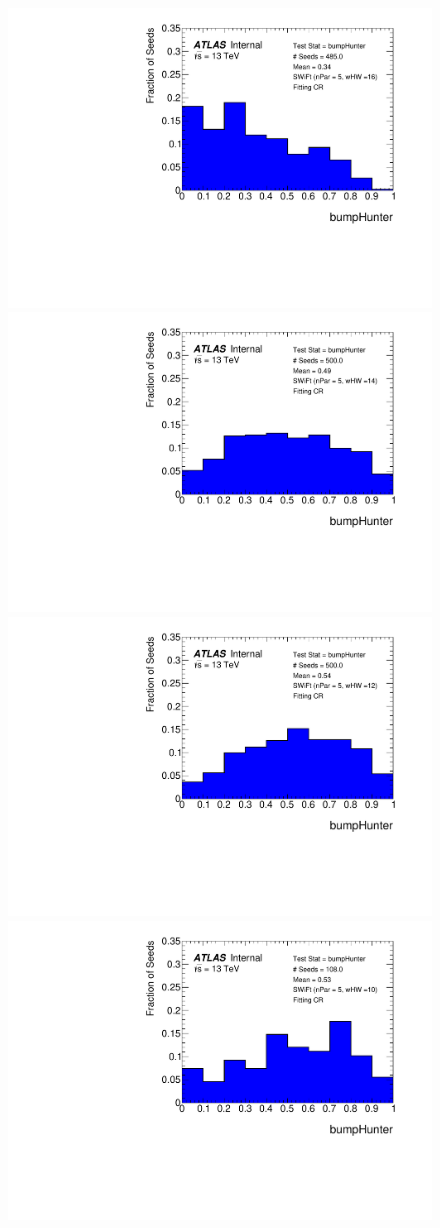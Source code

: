 \begin{figure}[!htb]
{}                                                                                              
 {                                                    
  \includegraphics[width=0.45\linewidth, angle=0]{figs/Dibjet/LowMass/FitStudy/pVal_bumpHunter_corrFitCR_5para_low16_high16.pdf}
}                                                                                              
 {                                                    
  \includegraphics[width=0.45\linewidth, angle=0]{figs/Dibjet/LowMass/FitStudy/pVal_bumpHunter_corrFitCR_5para_low14_high14.pdf}
}                                                                                              
 {                                                    
  \includegraphics[width=0.45\linewidth, angle=0]{figs/Dibjet/LowMass/FitStudy/pVal_bumpHunter_corrFitCR_5para_low12_high12.pdf}
}                                                                                              
 {                                                    
  \includegraphics[width=0.45\linewidth, angle=0]{figs/Dibjet/LowMass/FitStudy/pVal_bumpHunter_corrFitCR_5para_low10_high10.pdf}
}
\end{figure}
